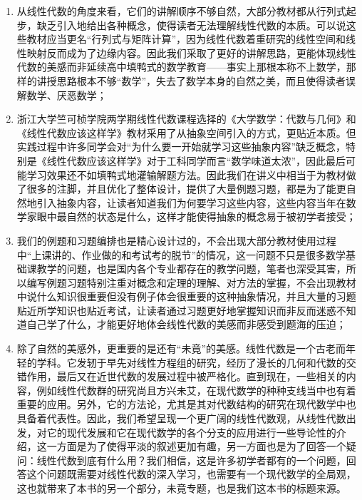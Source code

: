 \begin{enumerate}
    \item 从线性代数的角度来看，它们的讲解顺序不够自然，大部分教材都从行列式起步，缺乏引入地给出各种概念，使得读者无法理解线性代数的本质。可以说这些教材应当更名``行列式与矩阵计算''，因为线性代数着重研究的线性空间和线性映射反而成为了边缘内容。因此我们采取了更好的讲解思路，更能体现线性代数的美感而非延续高中填鸭式的数学教育——事实上那根本称不上数学，那样的讲授思路根本不够``数学''，失去了数学本身的自然之美，而且使得读者误解数学、厌恶数学；

    \item 浙江大学竺可桢学院两学期线性代数课程选择的《大学数学：代数与几何》和《线性代数应该这样学》教材采用了从抽象空间引入的方式，更贴近本质。但实践过程中许多同学会对``为什么要一开始就学习这些抽象内容''缺乏概念，特别是《线性代数应该这样学》对于工科同学而言``数学味道太浓''，因此最后可能学习效果还不如填鸭式地灌输解题方法。因此我们在讲义中相当于为教材做了很多的注脚，并且优化了整体设计，提供了大量例题习题，都是为了能更自然地引入抽象内容，让读者知道我们为何要学习这些内容，这些内容当年在数学家眼中最自然的状态是什么，这样才能使得抽象的概念易于被初学者接受；

    \item 我们的例题和习题编排也是精心设计过的，不会出现大部分教材使用过程中``上课讲的、作业做的和考试考的脱节''的情况，这一问题不只是很多数学基础课教学的问题，也是国内各个专业都存在的教学问题，笔者也深受其害，所以编写例题习题特别注重对概念和定理的理解、对方法的掌握，不会出现教材中说什么知识很重要但没有例子体会很重要的这种抽象情况，并且大量的习题贴近所学知识也贴近考试，让读者通过习题更好地掌握知识而非反而迷惑不知道自己学了什么，才能更好地体会线性代数的美感而非感受到题海的压迫；

    \item 除了自然的美感外，更重要的是还有``未竟''的美感。线性代数是一个古老而年轻的学科。它发轫于早先对线性方程组的研究，经历了漫长的几何和代数的交错作用，最后又在近世代数的发展过程中被严格化。直到现在，一些相关的内容，例如线性代数群的研究尚且方兴未艾，在现代数学的种种支线当中也有着重要的应用。另外，它的方法论，尤其是其对代数结构的研究在现代数学中也具备着代表性。因此，我们希望呈现一个更广阔的线性代数观，从线性代数出发，对它的现代发展和它在现代数学的各个分支的应用进行一些导论性的介绍，这一方面是为了使得平淡的叙述更加有趣，另一方面也是为了回答一个疑问：线性代数到底有什么用？我们相信，这是许多初学者都有的一个问题，回答这个问题既需要对线性代数的深入学习，也需要有一个现代数学的全局观，这也就带来了本书的另一个部分，未竟专题，也是我们这本书的标题来源。
\end{enumerate}

